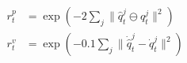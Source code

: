 \documentclass[border=8pt,12pt]{standalone}
\begin{document}
\color{ink}
$\displaystyle \begin{aligned}r_t^p&=\exp\!\left(-2\sum_j\|\hat q_t^j\ominus q_t^j\|^2\right)\\ r_t^v&=\exp\!\left(-0.1\sum_j\|\dot{\hat q}_t^j-\dot q_t^j\|^2\right)\end{aligned}$
\end{document}
